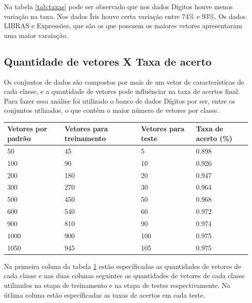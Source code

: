 Na tabela \ref{tab:taxas} pode ser observado que nos dados Dígitos houve menos variação na taxa. Nos dados Íris houve certa variação entre 74\% e 93\%. Os dados LIBRAS e Expressões, que são os que possuem os maiores vetores apresentaram uma maior varaiação. 

\subsection{Quantidade de vetores X Taxa de acerto}
Os conjuntos de dados são compostos por mais de um vetor de características de cada classe, e a quantidade de vetores pode influênciar na taxa de acertos final. Para fazer essa análise foi utilizado o banco de dados Dígitos por ser, entre os conjuntos utlizados, o que contém o maior número de vetores por classe.

\begin{table}[h!]
	\begin{tabular}{|l|l|l|l|}
        \hline
	Vetores por padrão & Vetores para treinamento & Vetores para teste & Taxa de acerto (\%)\\ \hline
    	   50   & 	45		   &		5	& 	0.898\\ \hline
   	  100   & 	90		   &	       10	&	0.926\\ \hline
	  200   &      180   		   &	       20	&	0.947\\ \hline
    	  300 	&      270		   &	       30	&	0.964\\ \hline
    	  500 	&      450  		   & 	       50	&	0.968\\ \hline
    	  600 	&      540		   &	       60	&	0.972\\ \hline
    	  900 	&      810		   &	       90	&	0.974\\ \hline
    	 1000 	&      900		   &	      100	&	0.975\\ \hline
    	 1050 	&      945		   &	      105	&	0.975\\ \hline
	\end{tabular}
	\label{tab:vetorxtaxa}
\end{table}

Na primeira coluna da tabela \ref{tab:vetorxtaxa} estão específicadas as quantidades de vetores de cada classe e nas duas colunas seguintes as quantidades de vetores de cada classe utilizados na etapa de treinamento e na etapa de testes respectivamente. Na útlima coluna estão específicadas as taxas de acertos em cada teste. 

